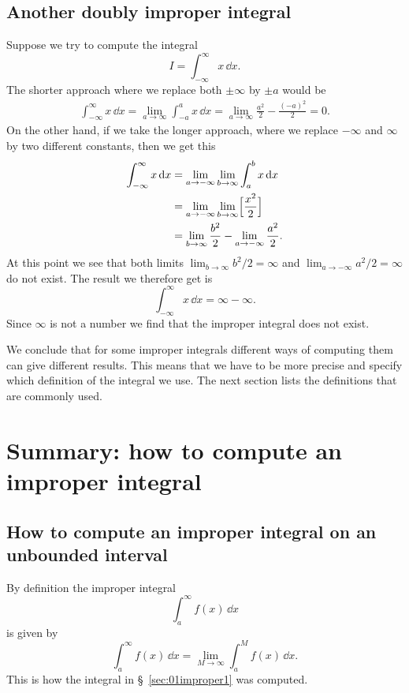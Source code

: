 \subsection{Another doubly improper integral} %
\label{sec:02doubly-improper-xdx}
Suppose we try to compute the integral
\[
I = \int_{-\infty}^\infty x\,\dd x.
\]
The shorter approach where we replace both $\pm\infty$ by $\pm a$ would be
\begin{align*}
  \int_{-\infty}^\infty x\,\dd x
  = \lim_{a\to\infty} \int_{-a}^a x\,\dd x
  = \lim_{a\to\infty} \frac{a^2} {2} - \frac{(-a)^2} {2} 
  = 0.
\end{align*}
On the other hand, if we take the longer approach, where we replace $-\infty$
and $\infty$ by two different constants, then we get this
\begin{align*}
  \int_{-\infty}^\infty x\,\mathrm{d} x
  &= \lim_{a\to-\infty} \lim_{b\to\infty} \int_{a}^b x\,\mathrm{d} x\\
  &= \lim_{a\to-\infty} \lim_{b\to\infty} \Bigl[\frac{x^2} {2}\Bigr]\\
  & = \lim_{b\to\infty} \frac{b^2} {2}  - \lim_{a\to-\infty} \frac{a^2} {2}.
\end{align*}
At this point we see that both limits $\lim_{b\to\infty}b^2/2 = \infty$ and
$\lim_{a\to-\infty} a^2/2=\infty$ do not exist.  The result we therefore get is
\[
  \int_{-\infty}^\infty x\,\dd x = \infty - \infty.
\]
Since $\infty$ is not a number we find that the improper integral does not
exist.

We conclude that for some improper integrals different ways of computing them
can give different results.  This means that we have to be more precise and
specify which definition of the integral we use.  The next section lists the
definitions that are commonly used.


\section{Summary: how to compute an improper integral} %

\subsection{How to compute an improper integral on an unbounded interval} By %
definition the improper integral
\[
\int_a^\infty f(x) \,\dd x
\]
is given by
\begin{equation}
  \label{eq:01improper-integral-def1}
  \int_a^\infty f(x) \,\dd x = \lim_{M\to\infty} \int_a^M f(x)\,\dd x.
\end{equation}
This is how the integral in \S~\ref{sec:01improper1} was computed.

